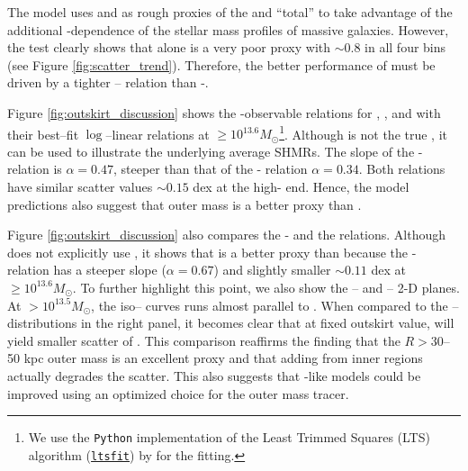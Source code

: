 \documentclass[fleqn,usenatbib,useAMS]{mnras}
\begin{document}
\begin{CJK*}{UTF8}{gbsn}
    The \asap{} model uses  and  as rough proxies of the \insitu{} and
    ``total'' \mstar{} to take advantage of the additional \mvir{}-dependence of the stellar mass
    profiles of massive galaxies.
    However, the \topn{} test clearly shows that  alone is a very poor \mvir{} proxy with
    \sigmvir{}$\sim 0.8$ in all four bins (see Figure \ref{fig:scatter_trend}).
    Therefore, the better performance of \masap{} must be driven by a tighter 
    \mvir{}-- relation than  \mvir{}-.
    
    Figure \ref{fig:outskirt_discussion} shows the \masap{}-observable relations for ,
    , and  with their best--fit $\log$--linear relations at
    \masap$\geq 10^{13.6} M_{\odot}$\footnote{We use the \texttt{Python} implementation of the Least
    Trimmed Squares (LTS) algorithm (\href{https://pypi.org/project/ltsfit/}{\texttt{ltsfit}}) by
    \citet{Cappellari13b} for the fitting.}.
    Although \masap{} is not the true \mvir{}, it can be used to illustrate the underlying average
    SHMRs.
    The slope of the \masap{}- relation is $\alpha = 0.47$, steeper than that of the
    \masap{}- relation $\alpha = 0.34$.
    Both relations have similar scatter values \sigms$\sim 0.15$ dex at the high-\masap{} end. 
    Hence, the \asap{} model predictions also suggest that outer mass  is a better
    \mvir{} proxy than .

    Figure \ref{fig:outskirt_discussion} also compares the \masap{}- and the
     relations. 
    Although \asap{} does not explicitly use , it shows that  is a
    better \mvir{} proxy than  because the \masap{}- relation has a
    steeper slope ($\alpha=0.67$) and slightly smaller \sigms$\sim 0.11$ dex at 
    \masap$\geq 10^{13.6} M_{\odot}$. 
    To further highlight this point, we also show the -- and
    -- 2-D planes.
    At \masap{}$>10^{13.5} M_{\odot}$, the iso--\masap{} curves runs almost parallel to
    .
    When compared to the -- distributions in the right panel, it becomes 
    clear that at fixed outskirt \mstar{} value,  will yield smaller scatter of 
    \masap{}.
    This comparison reaffirms the finding that the $R > 30$--50 kpc outer mass is an excellent
    \mvir{} proxy and that adding \mstar{} from inner regions actually degrades the scatter.
    This also suggests that \asap{}-like models could be improved using an optimized choice for the
    outer mass tracer.


\end{CJK*}
\end{document}
